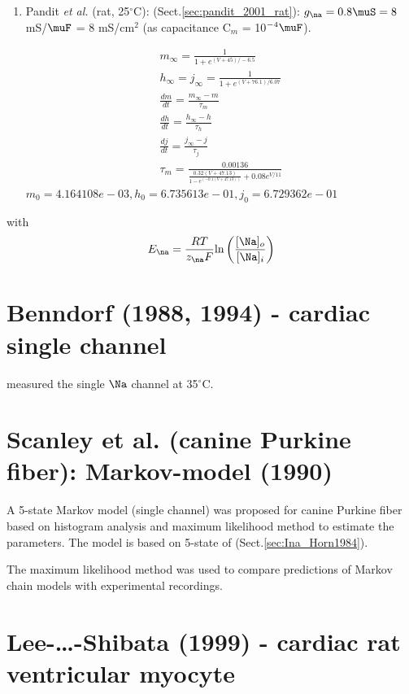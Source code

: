 \begin{enumerate}
  \item Pandit {\it et al.} \citep{pandit2001} (rat, 25$^\circ$C): 
  (Sect.\ref{sec:pandit_2001_rat}): $g_\na = 0.8\muS = 8$mS/$\muF$ = 8
  mS/cm$^2$ (as capacitance C$_m$ = 10$^{-4} \muF$).
  
  \begin{eqnarray*}
  m_\infty = \frac{1}{1+ e^{(V+45)/-6.5}} \\
  h_\infty = j_\infty = \frac{1}{1 + e^{(V+76.1)/6.07}} \\
  \frac{dm}{dt} = \frac{m_\infty - m}{\tau_m} \\
  \frac{dh}{dt} = \frac{h_\infty - h}{\tau_h} \\
  \frac{dj}{dt} = \frac{j_\infty - j}{\tau_j} \\
  \tau_m = \frac{0.00136}{\frac{0.32(V + 47.13)}{1-e^{(-0.1(V+47.13))}}+ 0.08
  e^{V/11}}
  \end{eqnarray*}
  $m_0= 4.164108e-03, h_0 = 6.735613e-01, j_0 = 6.729362e-01$ 
\end{enumerate}
with
\begin{equation}
E_\na = \frac{RT}{z_\na F} \ln\left( \frac{[\Na]_o}{[\Na]_i} \right)
\end{equation}


\section{Benndorf (1988, 1994) - cardiac single channel}

\citep{benndorf1984} measured the single $\Na$ channel at 35$^\circ$C. 

\section{Scanley et al. (canine Purkine fiber): Markov-model (1990)}
\label{sec:Ina_Scanley_1990}


A 5-state Markov model (single channel) was proposed for canine Purkine fiber
based on histogram analysis and maximum likelihood method to estimate the
parameters. The model is based on 5-state of \citep{Horn1984}
(Sect.\ref{sec:Ina_Horn1984}).

The maximum likelihood method was used to compare predictions of Markov chain
models with experimental recordings.
\section{Lee-\ldots-Shibata (1999) - cardiac rat ventricular myocyte}
\label{sec:Ina_Lee1999}

